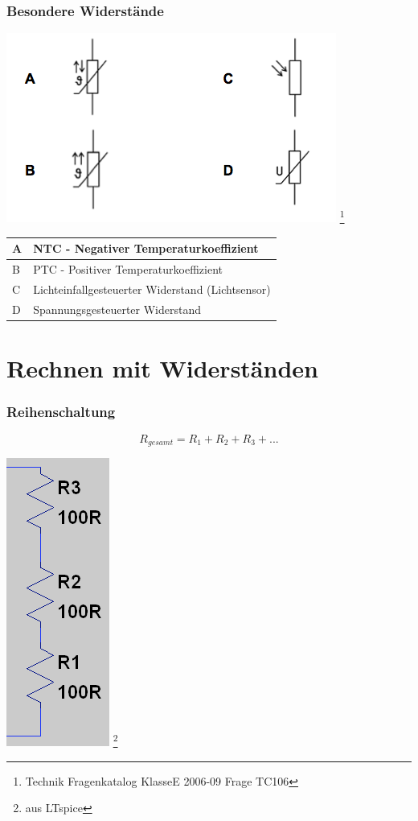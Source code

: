 \begin{frame}
    \frametitle{Besondere Widerstände}

    \begin{center}
        \includegraphics[width=.7\textwidth]{e04/bild-TC106.png}
        \footnote{\tiny Technik Fragenkatalog KlasseE 2006-09 Frage TC106}
 	
 	\begin{tabular}{l||l}\hline
        A & NTC - Negativer Temperaturkoeffizient \\ \hline
        B & PTC - Positiver Temperaturkoeffizient \\ \hline
        C & Lichteinfallgesteuerter Widerstand (Lichtsensor) \\ \hline
        D & Spannungsgesteuerter Widerstand \\ \hline
    \end{tabular}
 	    \end{center}
\end{frame}

\section*{Rechnen mit Widerständen}

\begin{frame}
    \frametitle{Reihenschaltung}
        
    $$R_{gesamt} = R_1 + R_2 + R_3 + ...$$

	\begin{center}
        \includegraphics[width=.2\textwidth]{e04/Reihe.png}
        \footnote{\tiny aus LTspice}
    \end{center}
\end{frame}

